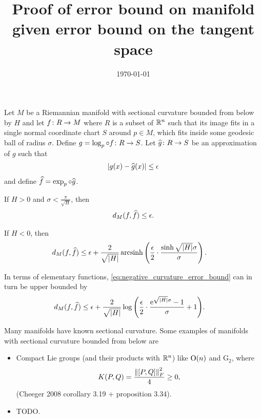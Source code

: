 \documentclass[english, a4paper, 12pt]{article}
\title{Proof of error bound on manifold given error bound on the tangent space}
\author{}
\date{\today}
\begin{document}
\maketitle

\begin{theorem}\label{thm:error_bond_on_manifold}
	Let $M$ be a Riemannian manifold with sectional curvature bounded from below by $H$ and let $f \colon R \to M$ where $R$ is a subset of $\mathbb{R}^n$ such that its image fits in a single normal coordinate chart $S$ around $p \in M$, which fits inside some geodesic ball of radius $\sigma$.
	Define $g = \operatorname{log}_p \circ f \colon R \to S$.
	Let $\widehat{g} \colon R \to S$ be an approximation of $g$ such that
	\begin{align}
		\abs{g(x) - \widehat{g}(x)} \leq \epsilon
	\end{align}
	and define $\widehat{f} = \operatorname{exp}_p \circ \widehat{g}$.

	If $H > 0$ and $\sigma < \frac{\pi}{\sqrt{H}}$, then
	\begin{align}
		d_M(f, \mathhat{f}) \leq \epsilon.%
		\label{eq:positive_curvature_error_bound}
	\end{align}

	If $H < 0$, then
	\begin{align}
		d_M(f, \mathhat{f}) \leq{}& \epsilon + \frac{2}{\sqrt{\abs{H}}} \operatorname{arcsinh} \left(
			\frac{\epsilon}{2} \cdot \frac{\sinh{\sqrt{\abs{H}} \sigma}}{\sigma}
			\right).%
		\label{eq:negative_curvature_error_bound}
	\end{align}
\end{theorem}

In terms of elementary functions, \cref{eq:negative_curvature_error_bound} can in turn be upper bounded by
\begin{align}
	d_M(f, \mathhat{f}) \leq{}& \epsilon + \frac{2}{\sqrt{\abs{H}}} \log{ \left(
		\frac{\epsilon}{2} \cdot \frac{\exp{\sqrt{\abs{H}} \sigma} - 1}{\sigma} + 1
		\right)}.%
	\label{eq:negative_curvature_error_bound_with_elementary_functions}
\end{align}

Many manifolds have known sectional curvature.
Some examples of manifolds with sectional curvature bounded from below are
\begin{itemize}
	\item Compact Lie groups (and their products with $\mathbb{R}^n$) like $\group{O}{n}$ and $\mathrm{G}_2$, where
	\begin{align}
		K(P, Q) = \frac{\norm{[P, Q]}_F^2}{4} \geq 0, 
	\end{align}
	(Cheeger 2008 corollary 3.19 + proposition 3.34).
	\item TODO.
\end{itemize}
\end{document}
